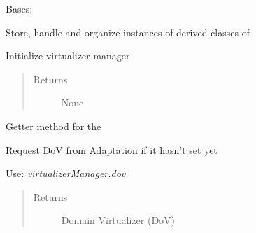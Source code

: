 \documentclass[letterpaper,10pt,english]{sphinxmanual}
\begin{document}
\begin{fulllineitems}
\label{orchest/virtualization_mgmt:escape.orchest.virtualization_mgmt.VirtualizerManager}
Bases: 

Store, handle and organize instances of derived classes of
{\hyperref[orchest/virtualization_mgmt:escape.orchest.virtualization_mgmt.AbstractVirtualizer]{\emph{}}}

\begin{fulllineitems}
\label{orchest/virtualization_mgmt:escape.orchest.virtualization_mgmt.VirtualizerManager._eventMixin_events}
\end{fulllineitems}


\begin{fulllineitems}
\label{orchest/virtualization_mgmt:escape.orchest.virtualization_mgmt.VirtualizerManager.__init__}
Initialize virtualizer manager
\begin{quote}\begin{description}
\item[{Returns}] \leavevmode
None

\end{description}\end{quote}

\end{fulllineitems}


\begin{fulllineitems}
\label{orchest/virtualization_mgmt:escape.orchest.virtualization_mgmt.VirtualizerManager.dov}
Getter method for the 

Request DoV from Adaptation if it hasn't set yet

Use: \emph{virtualizerManager.dov}
\begin{quote}\begin{description}
\item[{Returns}] \leavevmode
Domain Virtualizer (DoV)


\end{description}
\end{quote}
\end{fulllineitems}
\end{fulllineitems}
\end{document}
